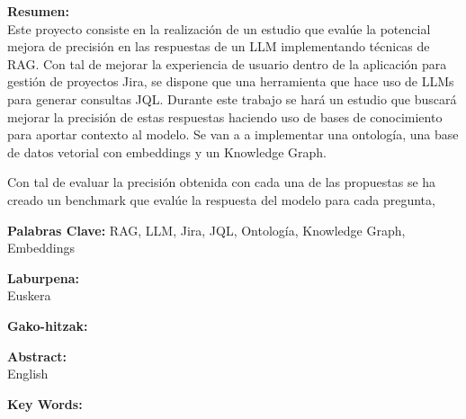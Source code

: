 \begin{itshape}
    \textbf{Resumen:} \\
        Este proyecto consiste en la realización de un estudio que evalúe la potencial mejora de precisión en las respuestas de un LLM implementando técnicas de RAG. Con tal de mejorar la experiencia de usuario dentro de la aplicación para gestión de proyectos Jira, se dispone que una herramienta que hace uso de LLMs para generar consultas JQL. Durante este trabajo se hará un estudio que buscará mejorar la precisión de estas respuestas haciendo uso de bases de conocimiento para aportar contexto al modelo. Se van a a implementar una ontología, una base de datos vetorial con embeddings y un Knowledge Graph.

        Con tal de evaluar la precisión obtenida con cada una de las propuestas se ha creado un benchmark que evalúe la respuesta del modelo para cada pregunta,

    
    \textbf{Palabras Clave:} RAG, LLM, Jira, JQL, Ontología, Knowledge Graph, Embeddings
\end{itshape}
\newpage

\begin{itshape}
    \textbf{Laburpena:} \\
    Euskera

    
    \textbf{Gako-hitzak:}
\end{itshape}
\newpage

\newpage

\begin{itshape}
    \textbf{Abstract:} \\
    English


    \textbf{Key Words:}
\end{itshape}
